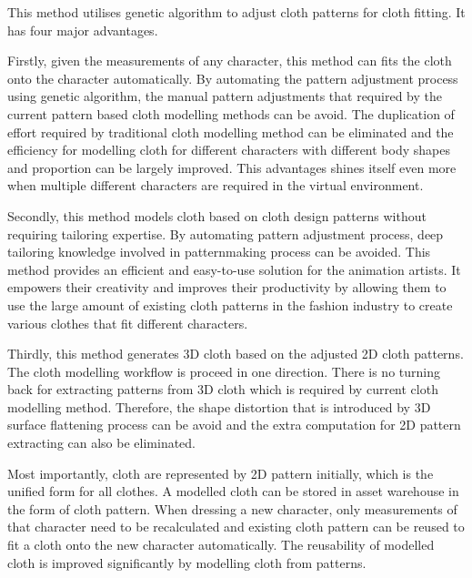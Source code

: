 This method utilises genetic algorithm to adjust cloth patterns for cloth fitting. It has four major advantages. 

Firstly, given the measurements of any character, this method can fits the cloth onto the character automatically. By automating the pattern adjustment process using genetic algorithm, the manual pattern adjustments that required by the current pattern based cloth modelling methods can be avoid. The duplication of effort required by traditional cloth modelling method can be eliminated and the efficiency for modelling cloth for different characters with different body shapes and proportion can be largely improved. This advantages shines itself even more when multiple different characters are required in the virtual environment. 

Secondly, this method models cloth based on cloth design patterns without requiring tailoring expertise. By automating pattern adjustment process, deep tailoring knowledge involved in patternmaking process can be avoided. This method provides an efficient and easy-to-use solution for the  animation artists. It empowers their creativity and improves their productivity by allowing them to use the large amount of existing cloth patterns in the fashion industry to create various clothes that fit different characters. 

Thirdly, this method generates 3D cloth based on the adjusted 2D cloth patterns. The cloth modelling workflow is proceed in one direction. There is no turning back for extracting patterns from 3D cloth which is required by current cloth modelling method.
Therefore, the shape distortion that is introduced by 3D surface flattening process can be avoid and the extra computation for 2D pattern extracting can also be eliminated. 

Most importantly, cloth are represented by 2D pattern initially, which is the unified form for all clothes. A modelled cloth can be stored in asset warehouse in the form of cloth pattern. When dressing a new character, only measurements of that character need to be recalculated and existing cloth pattern can be reused to fit a cloth onto the new character automatically. The reusability of modelled cloth is improved significantly by modelling cloth from patterns. 


